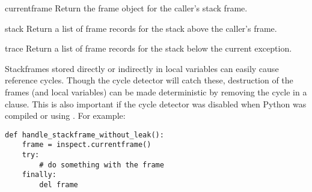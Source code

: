 \begin{funcdesc}{currentframe}{}
  Return the frame object for the caller's stack frame.
\end{funcdesc}

\begin{funcdesc}{stack}{}
  Return a list of frame records for the stack above the caller's
  frame.
\end{funcdesc}

\begin{funcdesc}{trace}{}
  Return a list of frame records for the stack below the current
  exception.
\end{funcdesc}

Stackframes stored directly or indirectly in local variables can
easily cause reference cycles.  Though the cycle detector will catch
these, destruction of the frames (and local variables) can be made
deterministic by removing the cycle in a  clause.
This is also important if the cycle detector was disabled when Python
was compiled or using .  For example:

\begin{verbatim}
def handle_stackframe_without_leak():
    frame = inspect.currentframe()
    try:
        # do something with the frame
    finally:
        del frame
\end{verbatim}
